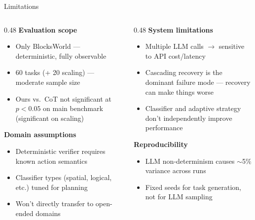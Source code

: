 \documentclass[aspectratio=169]{beamer}
\begin{document}
\begin{frame}{Limitations}

\begin{columns}[T]
\begin{column}{0.48\textwidth}
\textbf{Evaluation scope}
\begin{itemize}
    \item Only BlocksWorld --- deterministic, fully observable
    \item 60 tasks (+ 20 scaling) --- moderate sample size
    \item Ours vs.\ CoT not significant at $p < 0.05$ on main benchmark (significant on scaling)
\end{itemize}

\vspace{0.3cm}
\textbf{Domain assumptions}
\begin{itemize}
    \item Deterministic verifier requires known action semantics
    \item Classifier types (spatial, logical, etc.) tuned for planning
    \item Won't directly transfer to open-ended domains
\end{itemize}
\end{column}

\begin{column}{0.48\textwidth}
\textbf{System limitations}
\begin{itemize}
    \item Multiple LLM calls $\rightarrow$ sensitive to API cost/latency
    \item Cascading recovery is the dominant failure mode --- recovery can make things worse
    \item Classifier and adaptive strategy don't independently improve performance
\end{itemize}

\vspace{0.3cm}
\textbf{Reproducibility}
\begin{itemize}
    \item LLM non-determinism causes $\sim$5\% variance across runs
    \item Fixed seeds for task generation, not for LLM sampling
\end{itemize}
\end{column}
\end{columns}

\end{frame}
\end{document}
